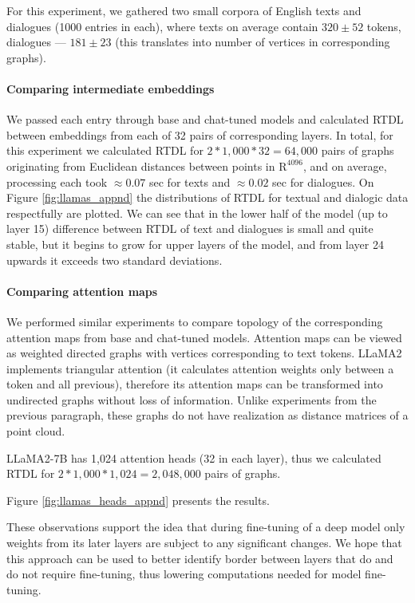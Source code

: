\documentclass[twoside]{article}
\begin{document}
For this experiment, we gathered two small corpora of English texts and dialogues (1000 entries in each), where texts on average contain $320 \pm 52$ tokens, dialogues --- $181 \pm 23$ (this translates into number of vertices in corresponding graphs). 

\paragraph{Comparing intermediate embeddings}
 We passed each entry through base and chat-tuned models and calculated RTDL between embeddings from each of 32 pairs of corresponding layers. 
In total, for this experiment we calculated RTDL for $2 * 1,000 * 32 = 64,000$ pairs of graphs originating from Euclidean distances between points in $\mathrm{R}^{4096}$, and on average, processing each took $\approx 0.07$ sec for texts and $\approx 0.02$ sec for dialogues.
On Figure \ref{fig:llamas_appnd}  the distributions of RTDL for textual and dialogic data respectfully are plotted. We can see that in the lower half of the model (up to layer 15) difference between RTDL of text and dialogues is small and quite stable, but it begins to grow for upper layers of the model, and from layer 24 upwards it exceeds two standard deviations. 

\paragraph{Comparing attention maps}

We performed similar experiments to compare topology of the corresponding attention maps from base and chat-tuned models. Attention maps can be viewed as weighted directed graphs with vertices corresponding to text tokens. LLaMA2 implements triangular attention (it calculates attention weights only between a token and all previous), therefore its attention maps can be transformed into undirected graphs without loss of information. Unlike experiments from the previous paragraph, these graphs do not have realization as distance matrices of a point cloud. 

LLaMA2-7B has 1,024 attention heads (32 in each layer), thus we calculated RTDL for $2 * 1,000 * 1,024 = 2,048,000$ pairs of graphs.

Figure \ref{fig:llamas_heads_appnd} presents the results.

These observations support the idea that during fine-tuning of a deep model only weights from its later layers are subject to any significant changes. We hope that this approach can be used to better identify border between layers that do and do not require fine-tuning, thus lowering computations needed for model fine-tuning.
\end{document}
